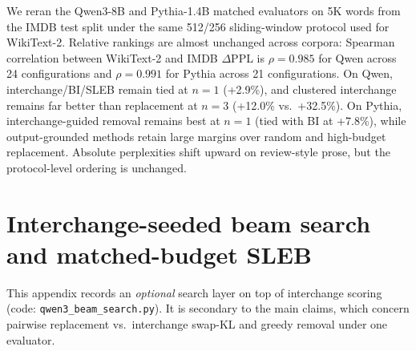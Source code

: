 \documentclass{article}
\newenvironment{tabhere}{%
  \par\medskip
  \begin{center}
}{%
  \end{center}
  \medskip
}
\begin{document}
We reran the Qwen3-8B and Pythia-1.4B matched evaluators on 5K words from the IMDB test split under the same 512/256 sliding-window protocol used for WikiText-2. Relative rankings are almost unchanged across corpora: Spearman correlation between WikiText-2 and IMDB $\Delta$PPL is $\rho{=}0.985$ for Qwen across 24 configurations and $\rho{=}0.991$ for Pythia across 21 configurations. On Qwen, interchange/BI/SLEB remain tied at $n{=}1$ (+2.9\%), and clustered interchange remains far better than replacement at $n{=}3$ (+12.0\% vs.\ +32.5\%). On Pythia, interchange-guided removal remains best at $n{=}1$ (tied with BI at +7.8\%), while output-grounded methods retain large margins over random and high-budget replacement. Absolute perplexities shift upward on review-style prose, but the protocol-level ordering is unchanged.

\section{Interchange-seeded beam search and matched-budget SLEB}
\label{sec:app_matched_budget}

\noindent This appendix records an \emph{optional} search layer on top of interchange scoring (code: \texttt{qwen3\_beam\_search.py}). It is secondary to the main claims, which concern pairwise replacement vs.\ interchange swap-KL and greedy removal under one evaluator.

\begin{tabhere}
\setlength{\tabcolsep}{4pt}
\label{tab:calfree_h2h}
\end{tabhere}
\end{document}
